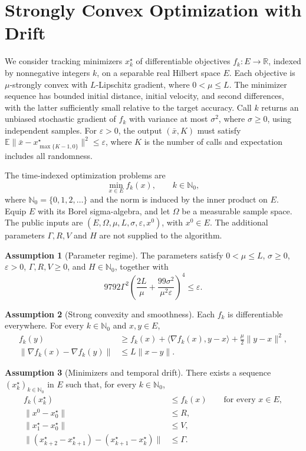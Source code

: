 \documentclass[10pt]{article}
\theoremstyle{definition}
\newtheorem{assumption}{Assumption}
\begin{document}
\section*{Strongly Convex Optimization with Drift}
We consider tracking minimizers $x_k^\star$ of differentiable objectives $f_k:E\to\mathbb{R}$, indexed by nonnegative integers $k$, on a separable real Hilbert space $E$. Each objective is $\mu$-strongly convex with $L$-Lipschitz gradient, where $0<\mu\leq L$. The minimizer sequence has bounded initial distance, initial velocity, and second differences, with the latter sufficiently small relative to the target accuracy. Call $k$ returns an unbiased stochastic gradient of $f_k$ with variance at most $\sigma^2$, where $\sigma\geq0$, using independent samples. For $\varepsilon>0$, the output $(\bar{x},K)$ must satisfy $\mathbb{E}\|\bar{x}-x_{\max\{K-1,0\}}^\star\|^2\leq\varepsilon$, where $K$ is the number of calls and expectation includes all randomness.

The time-indexed optimization problems are
\[
\min_{x\in E} f_k(x),\qquad k\in\mathbb{N}_0,
\]
where $\mathbb{N}_0=\{0,1,2,\ldots\}$ and the norm is induced by the inner product on $E$. Equip $E$ with its Borel sigma-algebra, and let $\Omega$ be a measurable sample space. The public inputs are $(E,\Omega,\mu,L,\sigma,\varepsilon,x^0)$, with $x^0\in E$. The additional parameters $\Gamma,R,V$ and $H$ are not supplied to the algorithm.

\begin{assumption}[Parameter regime]
The parameters satisfy $0<\mu\leq L$, $\sigma\geq0$, $\varepsilon>0$, $\Gamma,R,V\geq0$, and $H\in\mathbb{N}_0$, together with
\[
9792\Gamma^2
\left(\frac{2L}{\mu}+\frac{99\sigma^2}{\mu^2\varepsilon}\right)^4
\leq\varepsilon.
\]
\end{assumption}

\begin{assumption}[Strong convexity and smoothness]
Each $f_k$ is differentiable everywhere. For every $k\in\mathbb{N}_0$ and $x,y\in E$,
\[
\begin{aligned}
f_k(y)&\geq f_k(x)+\langle\nabla f_k(x),y-x\rangle
             +\frac{\mu}{2}\|y-x\|^2,\\
\|\nabla f_k(x)-\nabla f_k(y)\|&\leq L\|x-y\|.
\end{aligned}
\]
\end{assumption}

\begin{assumption}[Minimizers and temporal drift]
There exists a sequence $(x_k^\star)_{k\in\mathbb{N}_0}$ in $E$ such that, for every $k\in\mathbb{N}_0$,
\[
\begin{aligned}
f_k(x_k^\star)&\leq f_k(x) \qquad\text{for every }x\in E,\\
\|x^0-x_0^\star\|&\leq R,\\
\|x_1^\star-x_0^\star\|&\leq V,\\
\|(x_{k+2}^\star-x_{k+1}^\star)
 -(x_{k+1}^\star-x_k^\star)\|&\leq\Gamma.
\end{aligned}
\]
\end{assumption}
\end{document}
